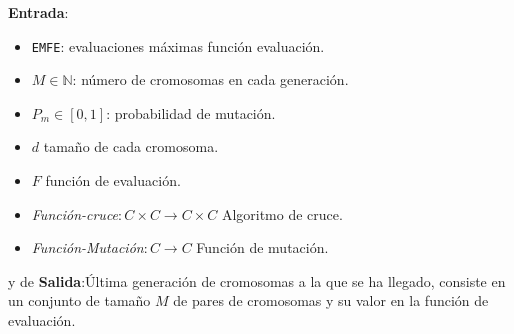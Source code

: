 \textbf{Entrada}:
        \begin{itemize}
          \item \texttt{EMFE}: evaluaciones máximas función evaluación.
          \item $M \in \mathbb{N}$: número de cromosomas en cada generación. 
          \item $P_m \in [0,1]$: probabilidad de mutación. 
          \item $d$ tamaño de cada cromosoma. 
          \item $F$ función de evaluación. 
          \item \textit{Función-cruce}$: C \times C \longrightarrow C \times C$ Algoritmo de cruce. 
          \item \textit{Función-Mutación}$: C \longrightarrow C $ Función de mutación. 
        \end{itemize}

y de 
\textbf{Salida}:Última generación de cromosomas a la que se ha llegado,
        consiste en un conjunto de tamaño $M$ de pares de cromosomas y su valor en la función de evaluación.

